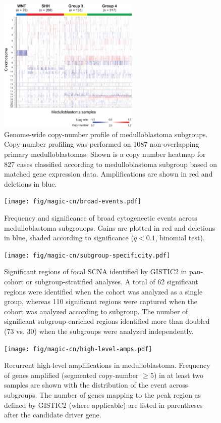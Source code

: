 \documentclass[11pt,letterpaper]{article}
\theoremstyle{definition}
\begin{document}
\begin{figure}
	\centering
	\includegraphics[width=0.6\textwidth]{fig/magic-cn/cn-heatmap.png}
	\caption{Genome-wide copy-number profile of medulloblastoma subgroups.
	Copy-number profiling was performed on 1087 non-overlapping primary medulloblastomas. Shown is a copy number heatmap for 827 cases classified according to medulloblastoma subgroup based on matched gene expression data.  Amplifications are shown in red and deletions in blue.}
	\label{fig:cn-heatmap}
\end{figure}

\begin{figure}
	\centering
	\texttt{[image: fig/magic-cn/broad-events.pdf]}
	\caption{Frequency and significance of broad cytogeneetic events across medulloblastoma subgrouops.
	Gains are plotted in red and deletions in blue, shaded according to significance ($q < 0.1$, binomial test).}
	\label{fig:broad-events}
\end{figure} 


\clearpage

\begin{figure}
	\centering
	\texttt{[image: fig/magic-cn/subgroup-specificity.pdf]}
	\caption{Significant regions of focal SCNA identified by GISTIC2 in pan-cohort or subgroup-stratified analyses.
	A total of 62 significant regions were identified when the cohort was analyzed as a single group, whereas 110 significant regions were captured when the cohort was analyzed according to subgroup. The number of significant subgroup-enriched regions identified more than doubled (73 vs. 30) when the subgroups were analyzed independently.}
	\label{fig:subgroup-specificity}
\end{figure}

\begin{figure}
	\centering
	\texttt{[image: fig/magic-cn/high-level-amps.pdf]}
	\caption{Recurrent high-level amplifications in medulloblastoma.
	Frequency of genes amplified (segmented copy-number $\geq 5$) in at least two samples are shown with the distribution of the event across subgroups. The number of genes mapping to the peak region as defined by GISTIC2 (where applicable) are listed in parentheses after the candidate driver gene.}
	\label{fig:high-level-amps}
\end{figure}
\end{document}
